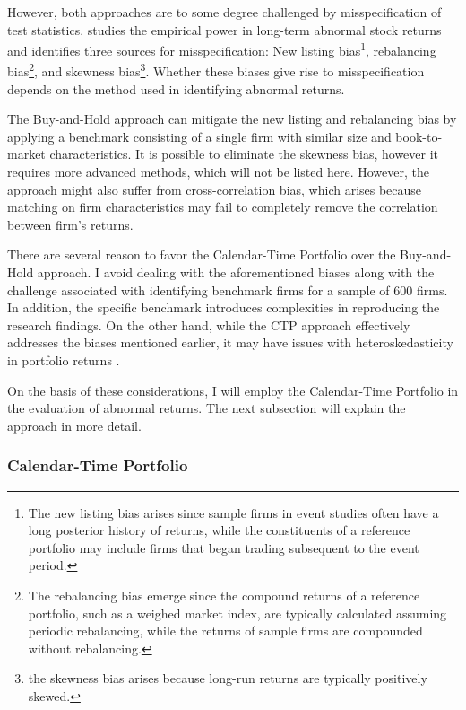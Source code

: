 However, both approaches are to some degree challenged by misspecification of test statistics. \cite{Lyon_1997_test_stats} studies the empirical power in long-term abnormal stock returns and identifies three sources for misspecification: New listing bias\footnote{The new listing bias arises since sample firms in event studies often have a long posterior history of returns, while the constituents of a reference portfolio may include firms that began trading subsequent to the event period.}, rebalancing bias\footnote{The rebalancing bias emerge since the compound returns of a reference portfolio, such as a weighed market index, are typically calculated assuming periodic rebalancing, while the returns of sample firms are compounded without rebalancing. }, and skewness bias\footnote{ the skewness bias arises because long-run returns are typically positively skewed.}. Whether these biases give rise to misspecification depends on the method used in identifying abnormal returns. 

The Buy-and-Hold approach can mitigate the new listing and rebalancing bias by applying a benchmark consisting of a single firm with similar size and book-to-market characteristics. It is possible to eliminate the skewness bias, however it requires more advanced methods, which will not be listed here. However, the approach might also suffer from cross-correlation bias, which arises because matching on firm characteristics may fail to completely remove the correlation between firm's returns. 

There are several reason to favor the Calendar-Time Portfolio over the Buy-and-Hold approach. I avoid dealing with the aforementioned biases along with the challenge associated with identifying benchmark firms for a sample of 600 firms. In addition, the specific benchmark introduces complexities in reproducing the research findings. On the other hand, while the CTP approach effectively addresses the biases mentioned earlier, it may have issues with heteroskedasticity in portfolio returns \cite{lyon1999improved}.

On the basis of these considerations, I will employ the Calendar-Time Portfolio in the evaluation of abnormal returns. The next subsection will explain the approach in more detail. 

\subsubsection{Calendar-Time Portfolio} \label{sec: CTP}

